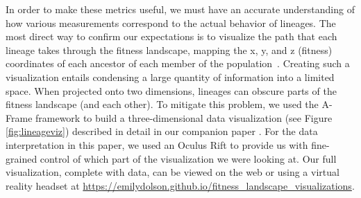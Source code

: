 \documentclass[letterpaper]{article}
\begin{document}

In order to make these metrics useful,
we must have an accurate understanding of how various measurements correspond to the actual behavior of lineages. The most direct way to confirm our expectations is to visualize the path that each lineage takes through the fitness landscape, mapping the x, y, and z (fitness) coordinates of each ancestor of each member of the population~\citep{virgo_lineage_2017}. Creating such a visualization entails condensing a large quantity of information into a limited space. When projected onto two dimensions, lineages can obscure parts of the fitness landscape (and each other). To mitigate this problem, we used the A-Frame framework \citep{aframe} to build a three-dimensional data visualization (see Figure \ref{fig:lineageviz}) described in detail in our companion paper \citep{dolson_visualizing_2018}.
For the data interpretation in this paper, we used an Oculus Rift to provide us with fine-grained control of which part of the visualization we were looking at. Our full visualization, complete with data, can be viewed on the web or using a virtual reality headset at \url{https://emilydolson.github.io/fitness_landscape_visualizations}.
\end{document}
